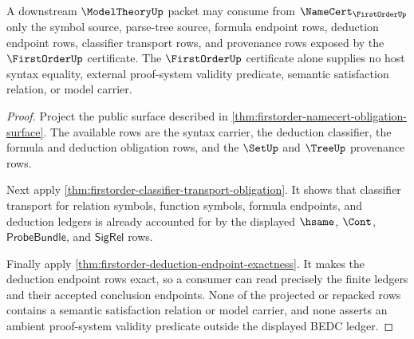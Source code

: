 \begin{theorem}\label{thm:firstorder-modeltheory-consumer-boundary}
A downstream $\ModelTheoryUp$ packet may consume from
$\NameCert_{\FirstOrderUp}$ only the symbol source, parse-tree source, formula
endpoint rows, deduction endpoint rows, classifier transport rows, and
provenance rows exposed by the $\FirstOrderUp$ certificate. The
$\FirstOrderUp$ certificate alone supplies no host syntax equality, external
proof-system validity predicate, semantic satisfaction relation, or model
carrier.
\end{theorem}
\begin{proof}
Project the public surface described in
\autoref{thm:firstorder-namecert-obligation-surface}. The available rows are
the syntax carrier, the deduction classifier, the formula and deduction
obligation rows, and the $\SetUp$ and $\TreeUp$ provenance rows.

Next apply \autoref{thm:firstorder-classifier-transport-obligation}. It shows
that classifier transport for relation symbols, function symbols, formula
endpoints, and deduction ledgers is already accounted for by the displayed
$\hsame$, $\Cont$, $\mathsf{ProbeBundle}$, and $\mathsf{SigRel}$ rows.

Finally apply \autoref{thm:firstorder-deduction-endpoint-exactness}. It makes
the deduction endpoint rows exact, so a consumer can read precisely the
finite ledgers and their accepted conclusion endpoints. None of the projected
or repacked rows contains a semantic satisfaction relation or model carrier,
and none asserts an ambient proof-system validity predicate outside the
displayed BEDC ledger.
\end{proof}

